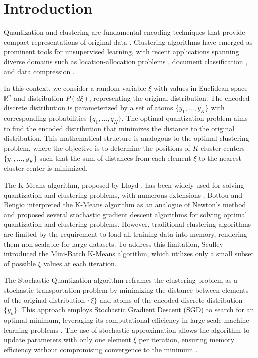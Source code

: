 \section{Introduction}

Quantization and clustering are fundamental encoding techniques that provide compact representations of original data \cite{Graf_Luschgy_2000,Jain_2010,Scholkopf_Smola_2002}. Clustering algorithms have emerged as prominent tools for unsupervised learning, with recent applications spanning diverse domains such as location-allocation problems \cite{Wang_Wei_2020}, document classification \cite{Radomirovic_2023,Widodo_2011}, and data compression \cite{Wan_2019}.

In this context, we consider a random variable $\xi$ with values in Euclidean space $\mathbb{R}^n$ and distribution $P(d\xi)$, representing the original distribution. The encoded discrete distribution is parameterized by a set of atoms $\{y_1, \ldots, y_K\}$ with corresponding probabilities $\{q_1, \ldots, q_K\}$. The optimal quantization problem aims to find the encoded distribution that minimizes the distance to the original distribution. This mathematical structure is analogous to the optimal clustering problem, where the objective is to determine the positions of $K$ cluster centers $\{y_1, \ldots, y_K\}$ such that the sum of distances from each element $\xi$ to the nearest cluster center is minimized.

The K-Means algorithm, proposed by Lloyd \cite{Lloyd_1982}, has been widely used for solving quantization and clustering problems, with numerous extensions \cite{Jain_2010}. Bottou and Bengio \cite{Bottou_1994} interpreted the K-Means algorithm as an analogue of Newton's method and proposed several stochastic gradient descent algorithms for solving optimal quantization and clustering problems. However, traditional clustering algorithms are limited by the requirement to load all training data into memory, rendering them non-scalable for large datasets. To address this limitation, Sculley \cite{Sculley_2010} introduced the Mini-Batch K-Means algorithm, which utilizes only a small subset of possible $\xi$ values at each iteration.

The Stochastic Quantization algorithm reframes the clustering problem as a stochastic transportation problem \cite{Kuzmenko_Uryasev_2019,Lakshmanan_Pichler_2023} by minimizing the distance between elements of the original distribution $\{\xi\}$ and atoms of the encoded discrete distribution $\{y_k\}$. This approach employs Stochastic Gradient Descent (SGD) \cite{ermoliev1976stochastic,kiefer1952stochastic,Robbins_Monro_1951} to search for an optimal minimum, leveraging its computational efficiency in large-scale machine learning problems \cite{Bottou_2010}. The use of stochastic approximation allows the algorithm to update parameters with only one element $\xi$ per iteration, ensuring memory efficiency without compromising convergence to the minimum \cite{Newton_Yousefian_Pasupathy_2018}.


